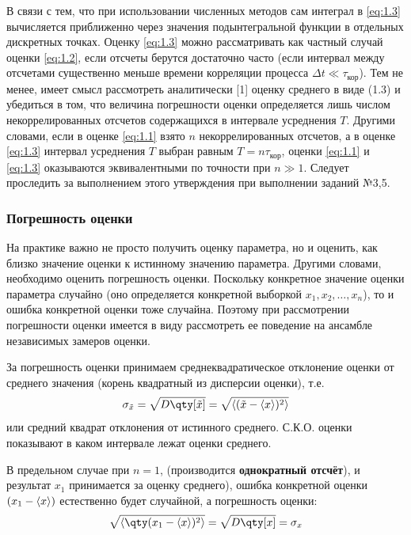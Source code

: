 В связи с тем, что при использовании численных методов сам интеграл в \eqref{eq:1.3}
вычисляется приближенно через значения подынтегральной функции в отдельных дискретных точках. Оценку 
\eqref{eq:1.3}  можно рассматривать как частный случай оценки \eqref{eq:1.2},
если отсчеты берутся достаточно часто (если интервал между отсчетами существенно меньше 
времени корреляции процесса $\Delta t \ll \tau_{\text{кор}}$). Тем не менее, имеет смысл
рассмотреть аналитически [1] оценку среднего в виде (1.3) и убедиться в том, что величина
погрешности оценки определяется лишь числом некоррелированных отсчетов содержащихся в 
интервале усреднения $T$.
Другими словами, если в оценке \eqref{eq:1.1}  взято $n$ некоррелированных отсчетов, а в
оценке \eqref{eq:1.3}  интервал усреднения $T$ выбран равным $T = n \tau_{\text{кор}}$,
оценки \eqref{eq:1.1}  и \eqref{eq:1.3}  оказываются эквивалентными по точности при $n\gg 1$. Следует проследить за выполнением этого утверждения при выполнении заданий №3,5.

\subsubsection{Погрешность оценки}%
\label{sec:pogreshnost_otsenki}
На практике важно не просто получить оценку параметра, но и оценить, как близко значение оценки к истинному значению параметра. Другими словами, необходимо оценить погрешность оценки. Поскольку конкретное значение оценки параметра случайно (оно определяется конкретной выборкой $x_{1},x_{2},\dots,x_n$), то и ошибка конкретной оценки тоже случайна. Поэтому при рассмотрении погрешности оценки имеется в виду рассмотреть ее поведение на ансамбле независимых замеров оценки.

За погрешность оценки принимаем среднеквадратическое отклонение оценки от среднего
значения (корень квадратный из дисперсии оценки), т.е.
\begin{equation}
\label{eq:2.1}
\sigma_{\tilde x} = \sqrt{ D\qty[\tilde x]} = \sqrt{ \mean{(\tilde x - \mean{x})^2} }
\end{equation}
или средний квадрат отклонения от истинного среднего. С.К.О. оценки показывают в каком интервале
лежат оценки среднего.

В предельном случае при $n=1$, (производится \textbf{однократный отсчёт}), и результат $x_{1}$ принимается за оценку среднего), ошибка конкретной оценки  $(x_{1}-\langle x\rangle)$ естественно будет случайной,
а погрешность оценки:
\begin{equation}
\label{eq:2.2}
\sqrt{ \mean{ \qty( x_{1} - \mean{x} )^2 } } = \sqrt{D\qty[x]} = \sigma_x
\end{equation}

